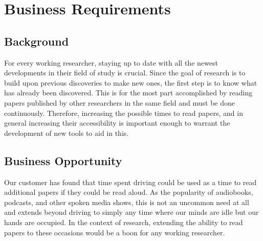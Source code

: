 \section{Business Requirements}
\subsection{Background}
For every working researcher, staying up to date with all the newest developments in their field of study is crucial. Since the goal of research is to build upon previous discoveries to make new ones, the first step is to know what has already been discovered. This is for the most part accomplished by reading papers published by other researchers in the same field and must be done continuously. Therefore, increasing the possible times to read papers, and in general increasing their accessibility is important enough to warrant the development of new tools to aid in this.

\subsection{Business Opportunity}
Our customer has found that time spent driving could be used as a time to read additional papers if they could be read aloud. As the popularity of audiobooks, podcasts, and other spoken media shows, this is not an uncommon need at all and extends beyond driving to simply any time where our minds are idle but our hands are occupied. In the context of research, extending the ability to read papers to these occasions would be a boon for any working researcher.

